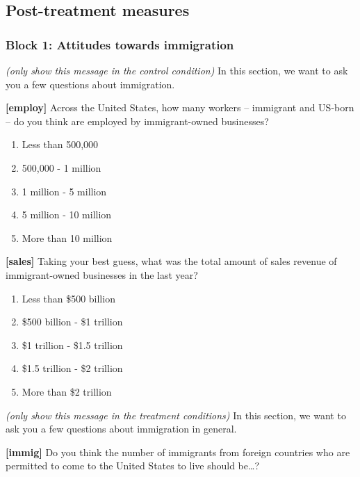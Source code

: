 \documentclass[
]{article}
\providecommand{\tightlist}{%
  \setlength{\itemsep}{0pt}\setlength{\parskip}{0pt}}
\begin{document}
\hypertarget{post-treatment-measures}{%
\subsection{Post-treatment measures}\label{post-treatment-measures}}

\hypertarget{block-1-attitudes-towards-immigration}{%
\subsubsection{Block 1: Attitudes towards
immigration}\label{block-1-attitudes-towards-immigration}}

\emph{(only show this message in the control condition)} In this
section, we want to ask you a few questions about immigration.

\textbf{{[}employ{]}} Across the United States, how many workers --
immigrant and US-born -- do you think are employed by immigrant-owned
businesses?

\begin{enumerate}
\def\labelenumi{\arabic{enumi}.}
\tightlist
\item
  Less than 500,000
\item
  500,000 - 1 million
\item
  1 million - 5 million
\item
  5 million - 10 million
\item
  More than 10 million
\end{enumerate}

\textbf{{[}sales{]}} Taking your best guess, what was the total amount
of sales revenue of immigrant-owned businesses in the last year?

\begin{enumerate}
\def\labelenumi{\arabic{enumi}.}
\tightlist
\item
  Less than \$500 billion
\item
  \$500 billion - \$1 trillion
\item
  \$1 trillion - \$1.5 trillion
\item
  \$1.5 trillion - \$2 trillion
\item
  More than \$2 trillion
\end{enumerate}

\emph{(only show this message in the treatment conditions)} In this
section, we want to ask you a few questions about immigration in
general.

\textbf{{[}immig{]}} Do you think the number of immigrants from foreign
countries who are permitted to come to the United States to live should
be\ldots?
\end{document}

